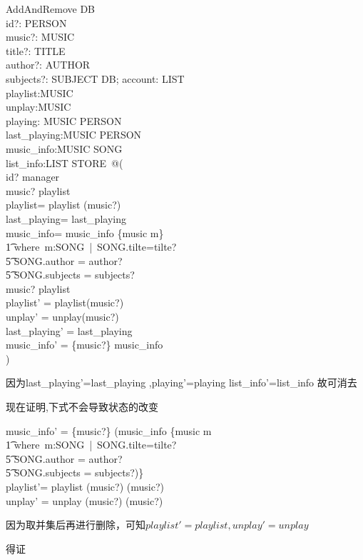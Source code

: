\documentclass[14pt]{article}
\numberwithin{figure}{subsection}
\begin{document}
\begin{schema}{AddAndRemove}
    \Delta DB\\
    id?: PERSON\\
    music?: MUSIC\\
    title?: TITLE\\
    author?: AUTHOR\\
    subjects?: SUBJECT
    \where
    \exists DB\plus ;
    account: \power LIST\\
    playlist:\power MUSIC\\
    unplay:\power MUSIC\\
    playing: MUSIC \pfun PERSON\\
    last\_playing:\power MUSIC \pfun PERSON\\
    music\_info:\power MUSIC \pfun SONG\\
    list\_info:\power LIST \pfun STORE\ @(\\
    id? \in manager\\
    music? \not \in playlist\\
    playlist\plus = playlist \cup (music?)\\
    last\_playing\plus = last\_playing\\
    music\_info\oplus = music\_info \oplus \{music \mapsto m\}\\
    \t1 where\ m:SONG\ |\ SONG.tilte=tilte?\\
    \t5 \quad SONG.author = author?\\
    \t5 \quad SONG.subjects = subjects?\\
    music? \in playlist\plus \\
    playlist' = playlist\plus \setminus (music?)\\
    unplay' = unplay\plus \setminus (music?)\\
    last\_playing' = last\_playing\plus \\
    music\_info' = \{music?\} \ndres music\_info\plus\\
    )
\end{schema}

因为last\_playing'=last\_playing ,playing'=playing
list\_info'=list\_info 故可消去

现在证明,下式不会导致状态的改变

\begin{syntax}
    music\_info' = \{music?\} \ndres (music\_info \oplus \{music \mapsto m\\
    \t1 where\ m:SONG\ |\ SONG.tilte=tilte?\\
    \t5 \quad SONG.author = author?\\
    \t5 \quad SONG.subjects = subjects?)\}\\
    playlist'= playlist \cup (music?) \setminus (music?)\\
    unplay' = unplay \cup (music?) \setminus (music?)\\
\end{syntax}

因为取并集后再进行删除，可知$playlist'=playlist,unplay'=unplay$

得证
\end{document}
